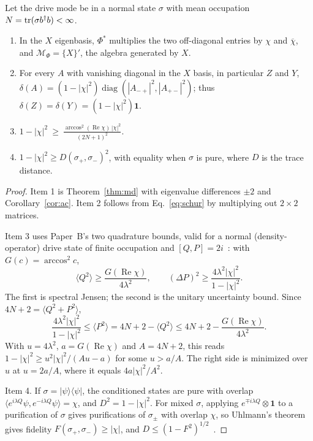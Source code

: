 \begin{theorem}
\label{thm:flip}
Let the drive mode be in a normal state $\sigma$ with mean occupation $N=\operatorname{tr}(\sigma b^\dagger b)<\infty$.
\begin{enumerate}
\item In the $X$ eigenbasis, $\Phi^*$ multiplies the two off-diagonal entries by $\chi$ and $\overline\chi$, and $\mathcal M_\Phi=\{X\}'$, the algebra generated by $X$.
\item For every $A$ with vanishing diagonal in the $X$ basis, in particular $Z$ and $Y$, $\delta(A)=(1-|\chi|^2)\operatorname{diag}(|A_{-+}|^2,|A_{+-}|^2)$; thus $\delta(Z)=\delta(Y)=(1-|\chi|^2)\mathbf 1$.
\item $\displaystyle 1-|\chi|^2\ \ge\ \frac{\arccos^2(\operatorname{Re}\chi)\,|\chi|^2}{(2N+1)^2}$.
\item $1-|\chi|^2\ge D(\sigma_+,\sigma_-)^2$, with equality when $\sigma$ is pure, where $D$ is the trace distance.
\end{enumerate}
\end{theorem}

\begin{proof}
Item 1 is Theorem~\ref{thm:md} with eigenvalue differences $\pm2$ and Corollary~\ref{cor:ac}. Item 2 follows from Eq.~\eqref{eq:schur} by multiplying out $2\times2$ matrices.

Item 3 uses Paper~B's two quadrature bounds, valid for a normal (density-operator) drive state of finite occupation and $[Q,P]=2i$~\cite{Liu2026QRAIF_B}: with $G(c)=\arccos^2c$,
\[
 \langle Q^2\rangle\ge\frac{G(\operatorname{Re}\chi)}{4\lambda^2},
 \qquad
 (\Delta P)^2\ge\frac{4\lambda^2|\chi|^2}{1-|\chi|^2}.
\]
The first is spectral Jensen; the second is the unitary uncertainty bound. Since $4N+2=\langle Q^2+P^2\rangle$,
\[
\frac{4\lambda^2|\chi|^2}{1-|\chi|^2}\le\langle P^2\rangle=4N+2-\langle Q^2\rangle\le4N+2-\frac{G(\operatorname{Re}\chi)}{4\lambda^2}.
\]
With $u=4\lambda^2$, $a=G(\operatorname{Re}\chi)$ and $A=4N+2$, this reads $1-|\chi|^2\ge u^2|\chi|^2/(Au-a)$ for some $u>a/A$. The right side is minimized over $u$ at $u=2a/A$, where it equals $4a|\chi|^2/A^2$.

Item 4. If $\sigma=|\psi\rangle\langle\psi|$, the conditioned states are pure with overlap $\langle e^{i\lambda Q}\psi,e^{-i\lambda Q}\psi\rangle=\chi$, and $D^2=1-|\chi|^2$. For mixed $\sigma$, applying $e^{\mp i\lambda Q}\otimes\mathbf 1$ to a purification of $\sigma$ gives purifications of $\sigma_\pm$ with overlap $\chi$, so Uhlmann's theorem gives fidelity $F(\sigma_+,\sigma_-)\ge|\chi|$, and $D\le(1-F^2)^{1/2}$~\cite{Uhlmann1976,FuchsVanDeGraaf1999}.
\end{proof}


